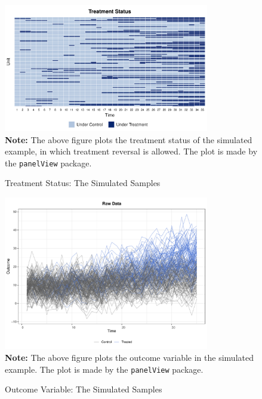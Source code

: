 \documentclass[12pt]{article}
\let\oldcenter\center
\let\oldendcenter\endcenter
\renewenvironment{center}{\setlength\topsep{0pt}\oldcenter}{\oldendcenter}
\begin{document}
\begin{figure}[!th]
\caption{Treatment Status: The Simulated Samples}\label{fg:sim.treat}
\centering
\begin{minipage}{0.85\linewidth}{
\begin{center}
\includegraphics[width = 0.8\textwidth]{sim0_treat.pdf}\\
\end{center}
}
\footnotesize\textbf{Note:} The above figure plots the treatment status of the simulated example, in which treatment reversal is allowed. The plot is made by the \texttt{panelView} package.
\end{minipage}
\end{figure}

\begin{figure}[!th]
\caption{Outcome Variable: The Simulated Samples}\label{fg:sim.outcome}
\centering
\begin{minipage}{0.85\linewidth}{
\begin{center}
\includegraphics[width = 0.8\textwidth]{sim0_outcome.pdf}\\
\end{center}
}
\footnotesize\textbf{Note:} The above figure plots the outcome variable in the simulated example. The plot is made by the \texttt{panelView} package.
\end{minipage}
\end{figure}
\clearpage
\end{document}

